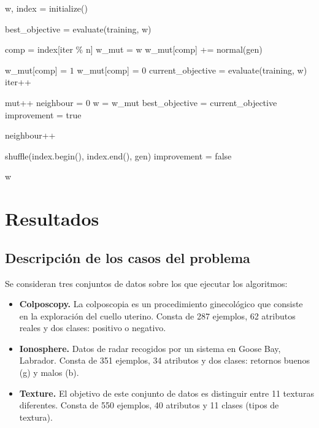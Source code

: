 \documentclass[12pt]{article}
\begin{document}
\begin{algorithm}[h!]
\begin{algorithmic}


\State w, index = initialize()

\State best\_objective = evaluate(training, w)

    \State comp = index[iter $\%$ n]
    \State w\_mut = w
    \State w\_mut[comp] += normal(gen)

     \State w\_mut[comp] = $1$
     \State w\_mut[comp] = $0$
    \EndIf
    \State current\_objective = evaluate(training, w)
    \State iter++

      \State mut++
      \State neighbour = $0$
      \State w = w\_mut
      \State best\_objective = current\_objective
      \State improvement = true

    \Else
      \State neighbour++
    \EndIf

      \State shuffle(index.begin(), index.end(), gen)
      \State improvement = false
    \EndIf
  \EndWhile

\State \Return w
\EndFunction

\end{algorithmic}
\end{algorithm}

\newpage
\section{Resultados}

\subsection*{Descripción de los casos del problema}
\label{casos}

Se consideran tres conjuntos de datos sobre los que ejecutar los algoritmos:

\begin{itemize}
	\item \textbf{Colposcopy.} La colposcopia es un procedimiento ginecológico que
consiste en la exploración del cuello uterino. Consta de 287 ejemplos, 62 atributos reales y dos clases: positivo o negativo.
    \item \textbf{Ionosphere.} Datos de radar recogidos por un sistema en Goose Bay, Labrador. Consta de 351 ejemplos, 34 atributos y dos clases: retornos buenos (g) y malos (b).
    \item \textbf{Texture.} El objetivo de este conjunto de datos es distinguir entre 11
texturas diferentes. Consta de 550 ejemplos, 40 atributos y 11 clases (tipos de textura).
\end{itemize}
\end{document}
